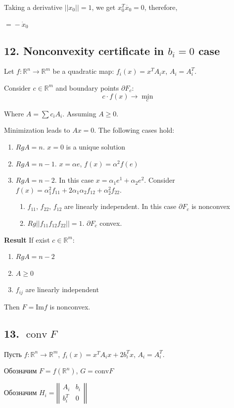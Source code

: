 \documentclass[a4paper]{article}
\DeclareMathOperator{\conv}{conv}
\begin{document}
Taking a derivative $||x_0||=1$, we get $x_0^T\dot{x_0}=0$, therefore,

$\boxed{=}-\dot{x}_0$

\subsection*{12. Nonconvexity certificate in $b_i=0$ case}

Let $f\colon \mathbb{R}^n\to\mathbb{R}^m$ be a quadratic map: $f_i(x)=x^TA_ix$, $A_i=A_i^T$.

Consider $c\in\mathbb{R}^m$ and boundary points $\partial F_c$:
$$c\cdot f(x)\to \min\limits_c$$

Where $A=\sum c_iA_i$. Assuming $A\geqslant 0$.

Minimization leads to $Ax=0$. The following cases hold:
\begin{enumerate}
	\item $RgA=n$. $x=0$ is a unique solution
	\item $RgA=n-1$. $x=\alpha e$, $f(x)=\alpha^2 f(e)$
	\item $RgA=n-2$. In this case $x=\alpha_1 e^1+\alpha_2 e^2$. Consider $f(x)=\alpha_1^2 f_{11}+2\alpha_1\alpha_2f_{12}+\alpha_2^2f_{22}$.
	\begin{enumerate}
		\item $f_{11}$, $f_{22}$, $f_{12}$ are linearly independent. In this case $\partial F_c$ is nonconvex
		\item $Rg ||f_{11} f_{12} f_{22}||=1$. $\partial F_c$ convex.
	\end{enumerate}
\end{enumerate}


{\bf Result}
If exist $c\in\mathbb{R}^m$:
\begin{enumerate}
	\item $RgA=n-2$
	\item $A\geqslant 0$
	\item $f_{ij}$ are linearly independent
\end{enumerate}
Then $F=\mbox{Im}f$ is nonconvex.

\subsection*{13. $\conv F$}
Пусть $f\colon \mathbb{R}^n\to\mathbb{R}^m$, $f_i(x)=x^TA_ix+2b_i^Tx$, $A_i=A_i^T$.

Обозначим $F=f(\mathbb{R}^n)$, $G=\mbox{conv}F$

Обозначим $H_i=\left|\left|
\begin{array}{cc}
A_i & b_i\\
b_i^T & 0
\end{array}
\right|\right|$
\end{document}
